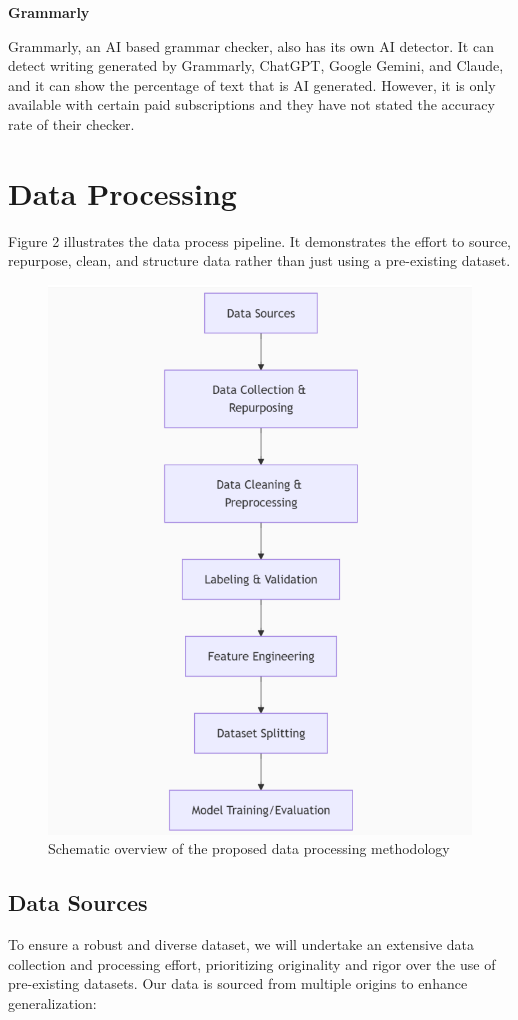 \documentclass{article} %
\begin{document}
\textbf{Grammarly} ~\citep{Grammarly}

Grammarly, an AI based grammar checker, also has its own AI detector. It can detect writing generated by Grammarly, ChatGPT, Google Gemini, and Claude, and it can show the percentage of text that is AI generated. However, it is only available with certain paid subscriptions and they have not stated the accuracy rate of their checker.

\newpage
\section{Data Processing}
Figure 2 illustrates the data process pipeline. It demonstrates the effort to source, repurpose, clean, and structure data rather than just using a pre-existing dataset.

\begin{figure}[H]
    \centering
    \includegraphics[width=0.7\linewidth,height=0.4\textheight,keepaspectratio]{data.png}
    \caption{Schematic overview of the proposed data processing methodology}
    \label{fig:pipeline}
\end{figure}

\subsection{Data Sources}
To ensure a robust and diverse dataset, we will undertake an extensive data collection and processing effort, prioritizing originality and rigor over the use of pre-existing datasets. Our data is sourced from multiple origins to enhance generalization:
\end{document}
